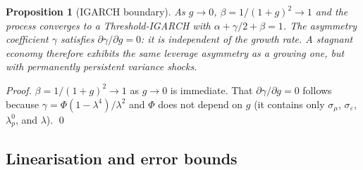 \documentclass[12pt,a4paper]{article}
\newtheorem{proposition}[theorem]{Proposition}
\theoremstyle{definition}
\begin{document}
\begin{proposition}[IGARCH boundary]
\label{prop:igarch}
As $g \to 0$, $\beta = 1/(1+g)^2 \to 1$ and the process converges
to a Threshold-IGARCH with $\alpha + \gamma/2 + \beta = 1$. The
asymmetry coefficient $\gamma$ satisfies $\partial\gamma/\partial g
= 0$: it is independent of the growth rate. A stagnant economy
therefore exhibits the same leverage asymmetry as a growing one,
but with permanently persistent variance shocks.
\end{proposition}

\begin{proof}
$\beta = 1/(1+g)^2 \to 1$ as $g \to 0$ is immediate. That
$\partial\gamma/\partial g = 0$ follows because $\gamma =
\Phi(1-\lambda^4)/\lambda^2$ and $\Phi$ does not depend on $g$
(it contains only $\sigma_\mu$, $\sigma_\varepsilon$, $\lambda^0_p$,
and $\lambda$).
\qed
\end{proof}

\subsection{Linearisation and error bounds}
\end{document}
